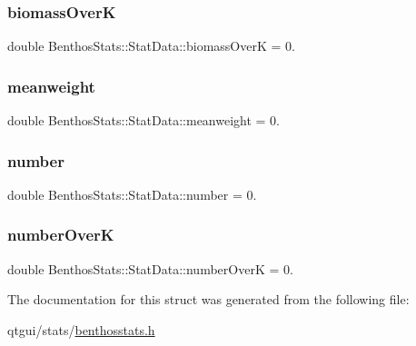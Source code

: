 \subsubsection{\texorpdfstring{biomassOverK}{biomassOverK}}
{\footnotesize\ttfamily double Benthos\+Stats\+::\+Stat\+Data\+::biomass\+OverK = 0.}

\mbox{\label{struct_benthos_stats_1_1_stat_data_a3cd5403b1c7d822061641697dcab1ac1}} 
\subsubsection{\texorpdfstring{meanweight}{meanweight}}
{\footnotesize\ttfamily double Benthos\+Stats\+::\+Stat\+Data\+::meanweight = 0.}

\mbox{\label{struct_benthos_stats_1_1_stat_data_a525ddb24d67ba1db3558c6f1530175b3}} 
\subsubsection{\texorpdfstring{number}{number}}
{\footnotesize\ttfamily double Benthos\+Stats\+::\+Stat\+Data\+::number = 0.}

\mbox{\label{struct_benthos_stats_1_1_stat_data_abcb2b3d406a2b522279c9a12d789d30f}} 
\subsubsection{\texorpdfstring{numberOverK}{numberOverK}}
{\footnotesize\ttfamily double Benthos\+Stats\+::\+Stat\+Data\+::number\+OverK = 0.}



The documentation for this struct was generated from the following file\+:\begin{DoxyCompactItemize}
\item 
qtgui/stats/\mbox{\hyperlink{benthosstats_8h}{benthosstats.\+h}}\end{DoxyCompactItemize}
